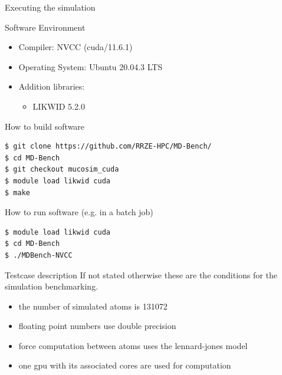 \documentclass[ignorenonframetext,aspectratio=169]{beamer}
\providecommand{\tightlist}{%
  \setlength{\itemsep}{0pt}\setlength{\parskip}{0pt}}
\begin{document}
\begin{frame}[fragile]{Executing the simulation}
    \begin{block}{Software Environment}
        \begin{itemize}
            \tightlist
            \item Compiler: NVCC (cuda/11.6.1)
            \item Operating System: Ubuntu 20.04.3 LTS
            \item Addition libraries:
            \begin{itemize}
                \tightlist
                \item LIKWID 5.2.0
            \end{itemize}
        \end{itemize}
    \end{block}
    
    \begin{block}{How to build software}
        \begin{verbatim}
$ git clone https://github.com/RRZE-HPC/MD-Bench/
$ cd MD-Bench
$ git checkout mucosim_cuda
$ module load likwid cuda
$ make
        \end{verbatim}
    \end{block}
    \vspace{-\baselineskip}
    \begin{block}{How to run software (e.g. in a batch job)}
        \begin{verbatim}
$ module load likwid cuda
$ cd MD-Bench
$ ./MDBench-NVCC
        \end{verbatim}
    \end{block}
\end{frame}

\begin{frame}[fragile]{Testcase description}
    \vspace*{-6\baselineskip}
    If not stated otherwise these are the conditions for the simulation benchmarking.
    
    \begin{itemize}
        \tightlist
        \item the number of simulated atoms is 131072
        \item floating point numbers use double precision
        \item force computation between atoms uses the lennard-jones model
        \item one gpu with its associated cores are used for computation
    \end{itemize}

\end{frame}
\end{document}
